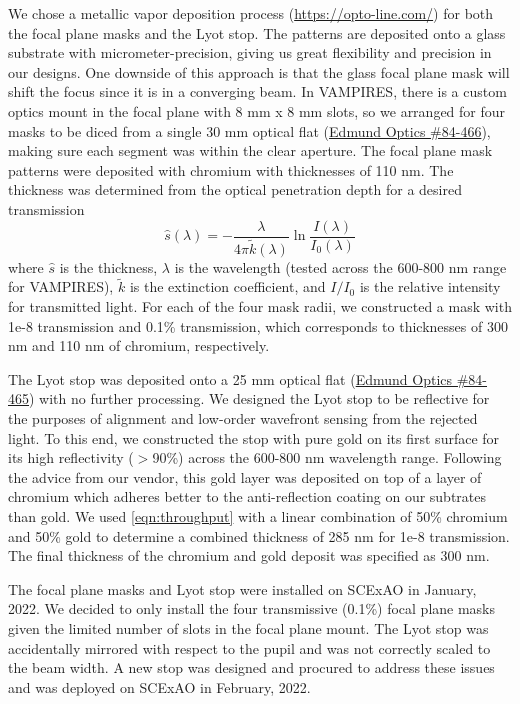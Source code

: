 \documentclass[]{spie}  %
\begin{document}
We chose a metallic vapor deposition process (\url{https://opto-line.com/}) for both the focal plane masks and the Lyot stop. The patterns are deposited onto a glass substrate with micrometer-precision, giving us great flexibility and precision in our designs. One downside of this approach is that the glass focal plane mask will shift the focus since it is in a converging beam. In VAMPIRES, there is a custom optics mount in the focal plane with 8 mm x 8 mm slots, so we arranged for four masks to be diced from a single 30 mm optical flat (\href{https://www.edmundoptics.com/p/30mm-dia-4mm-thick-nir-i-coated-lambda10-fused-silica-window/27562/}{Edmund Optics \#84-466}), making sure each segment was within the clear aperture. The focal plane mask patterns were deposited with chromium with thicknesses of 110 nm. The thickness was determined from the optical penetration depth for a desired transmission
\begin{equation}
    \hat{s}(\lambda) = -\frac{\lambda}{4\pi\tilde{k}(\lambda)}\ln{\frac{I(\lambda)}{I_0(\lambda)}}
    \label{eqn:throughput}
\end{equation}
where $\hat{s}$ is the thickness, $\lambda$ is the wavelength (tested across the 600-800 nm range for VAMPIRES), $\tilde{k}$ is the extinction coefficient, and $I/I_0$ is the relative intensity for transmitted light. For each of the four mask radii, we constructed a mask with 1e-8 transmission and 0.1\% transmission, which corresponds to thicknesses of 300 nm and 110 nm of chromium, respectively.

The Lyot stop was deposited onto a 25 mm optical flat (\href{https://www.edmundoptics.com/p/25mm-dia-3mm-thick-nir-i-coated-lambda10-fused-silica-window/27561/}{Edmund Optics \#84-465}) with no further processing. We designed the Lyot stop to be reflective for the purposes of alignment and low-order wavefront sensing from the rejected light. To this end, we constructed the stop with pure gold on its first surface for its high reflectivity ($>$90\%) across the 600-800 nm wavelength range. Following the advice from our vendor, this gold layer was deposited on top of a layer of chromium which adheres better to the anti-reflection coating on our subtrates than gold. We used \autoref{eqn:throughput} with a linear combination of 50\% chromium and 50\% gold to determine a combined thickness of 285 nm for 1e-8 transmission. The final thickness of the chromium and gold deposit was specified as 300 nm.

The focal plane masks and Lyot stop were installed on SCExAO in January, 2022. We decided to only install the four  transmissive (0.1\%) focal plane masks given the limited number of slots in the focal plane mount. The Lyot stop was accidentally mirrored with respect to the pupil and was not correctly scaled to the beam width. A new stop was designed and procured to address these issues and was deployed on SCExAO in February, 2022.
\end{document}
